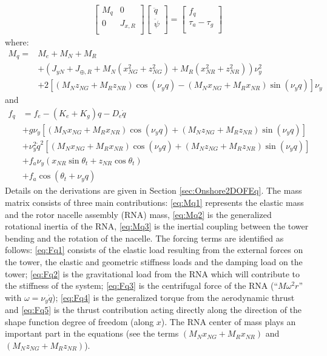 \documentclass[wes, manuscript]{copernicus}
\begin{document}
\begin{align}
    \begin{bmatrix}
    M_q & 0 \\ 
    0 & J_{x,R} \\ 
    \end{bmatrix}
    \begin{bmatrix}
    \ddot{q}\\
    \ddot{\psi}\\
    \end{bmatrix}
    =
    \begin{bmatrix}
    f_q \\
    \tau_a-\tau_g\\
    \end{bmatrix}
    \label{eq:EOM2DOF}
\end{align}
where:
\begin{align}
M_q = & M_{e} +  M_N + M_R \label{eq:Mq1}\\
     &+ (J_{y N} + J_{\oplus,R} + M_N(x_{NG}^{2} + z_{NG}^{2}) + M_R(x_{NR}^{2} + z_{NR}^{2}) ) \nu_y^{2}  \label{eq:Mq2}\\
     &+2  \left[   (M_N z_{NG} + M_R z_{NR}) \cos{\left(\nu_y q \right)} -(M_N x_{NG} + M_{R} x_{NR})\sin{\left(\nu_y q \right)} \right] \nu_y\label{eq:Mq3}
\end{align}
and
\begin{align}
 f_q &= f_{e} - (K_{e}+K_g) q  - D_{e} \dot{q} \label{eq:Fq1} \\
 &+ g \nu_y \left [ (M_N x_{NG}+M_R x_{NR}) \cos{\left(\nu_y q \right)}
 +                  (M_N z_{NG}+M_R z_{NR}) \sin{\left(\nu_y q \right)} \right]  \label{eq:Fq2}\\
 &+ \nu_y^2 \dot{q}^2\left[
  ( M_N x_{NG} + M_R x_{NR}) \cos{\left(\nu_y q \right)} 
 +( M_N z_{NG} + M_R z_{NR}) \sin{\left(\nu_y q \right)}
 \right]  \label{eq:Fq3} \\
 &+f_a \nu_y ( x_{NR} \sin\theta_t + z_{NR} \cos\theta_t)  \label{eq:Fq4} \\
 &+ f_a \cos{\left(\theta_t + \nu_y q \right)}\label{eq:Fq5} 
\end{align}
Details on the derivations are given in Section \ref{sec:Onshore2DOFEq}.
The mass matrix consists of three main contributions:
\autoref{eq:Mq1} represents the elastic mass and the rotor nacelle assembly (RNA) mass,
\autoref{eq:Mq2} is the generalized rotational inertia of the RNA, 
\autoref{eq:Mq3} is the inertial coupling between the tower bending and the rotation of the nacelle.
The forcing terms are identified as follows:
\autoref{eq:Fq1} consists of the elastic load resulting from the external forces on the tower, the elastic and geometric stiffness loads and the damping load on the tower; 
\autoref{eq:Fq2} is the gravitational load from the RNA which will contribute to the stiffness of the system; 
\autoref{eq:Fq3} is the centrifugal force of the RNA (``$M \omega^2 r$'' with $\omega=\nu_y \dot{q}$);
\autoref{eq:Fq4} is the generalized torque from the aerodynamic thrust and  
\autoref{eq:Fq5} is the thrust contribution acting directly along the direction of the shape function degree of freedom (along $x$).
The RNA center of mass plays an important part in the equations (see the terms $(M_N x_{NG}+M_R x_{NR})$ and $(M_N z_{NG}+M_R z_{NR})$). 
\end{document}

